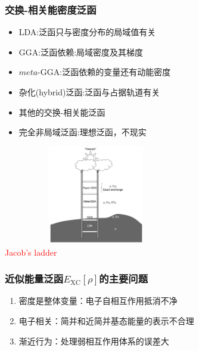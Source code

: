 \documentclass[cjk,slidestop,compress,mathserif,blue]{beamer}
\begin{document}
{
\frametitle{交换-相关能密度泛函}
\begin{minipage}[b]{0.72\linewidth}
 \hspace*{-15pt}
 \begin{itemize}%
	 \setlength{\itemsep}{10pt}
 \item \textrm{LDA}:泛函只与密度分布的局域值有关
 \item \textrm{GGA}:泛函依赖:局域密度及其梯度
 \item $meta$-\textrm{GGA}:泛函依赖的变量还有动能密度
 \item 杂化(\textrm{hybrid})泛函:泛函与占据轨道有关
 \item 其他的交换-相关能泛函
 \item<1-> 完全非局域泛函:理想泛函，不现实
 \end{itemize}
\end{minipage}
\hfill
\begin{minipage}[b]{0.26\linewidth}
\includegraphics[height=1.7in,width=3.18in,viewport=10 5 1380 700,clip]{Figures/Jacobi-ladder.png}\\
{\small \textcolor{red}{\textrm{Jacob's ladder}}}
\end{minipage}
}

\frame                               %
{
	\frametitle{近似能量泛函$E_{\mathrm{XC}}[\rho]$的主要问题}
   \vspace{20pt}
\begin{enumerate}%
   \setlength{\itemsep}{30pt}
 \item  密度是整体变量：电子自相互作用抵消不净%
 \item  电子相关：简并和近简并基态能量的表示不合理
 \item  渐近行为：处理弱相互作用体系的误差大
 \end{enumerate}
}
\end{document}

